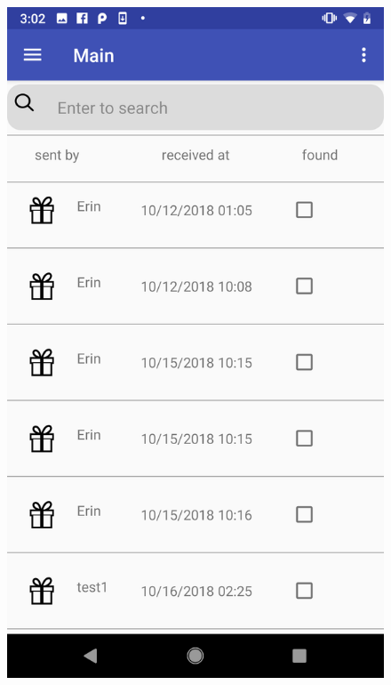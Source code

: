 \begin{figure}[htb]
\centering
\begin{minipage}[t]{0.45\textwidth}
\includegraphics[width=.95\textwidth]{section03/assets/MainPage.png}
\subcaption{\label{GiftsListMainUI}}
\end{minipage}%
\begin{minipage}[t]{0.45\textwidth}

\end{minipage}
\end{figure}
